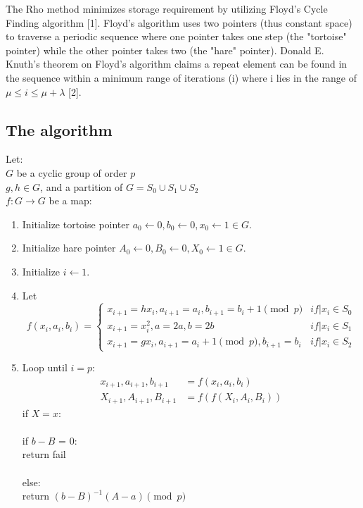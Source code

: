 \documentclass{article}
\begin{document}
    The Rho method minimizes storage requirement by utilizing Floyd's Cycle Finding algorithm [1].  Floyd's algorithm uses two pointers (thus constant space) to traverse a periodic sequence where one pointer takes one step (the "tortoise" pointer) while the other pointer takes two (the "hare" pointer).  Donald E. Knuth's theorem on Floyd's algorithm claims a repeat element can be found in the sequence within a minimum range of iterations (i) where i lies in the range of $\mu \leq i \leq \mu + \lambda$ [2]. \\

  \subsection{The algorithm}
    Let: \\
    $G$ be a cyclic group of order $p$ \\
    $g, h \in G$, and a partition of $G = S_0 \cup S_1 \cup S_2$ \\
    $f: G \to G$ be a map: \\
    \begin{enumerate} 
      \item Initialize tortoise pointer $a_0 \gets 0, b_0 \gets 0, x_0 \gets 1 \in G$. 
      \item Initialize hare pointer $A_0 \gets 0, B_0 \gets 0, X_0 \gets 1 \in G$.
      \item Initialize $i \gets 1$.
      \item Let 
        \[ f(x_i, a_i, b_i) = 
        \begin{cases}
          x_{i+1} = hx_i,  a_{i+1} = a_i,  b_{i+1} = b_i + 1\pmod p & {if\vert x_i \in S_0}\\
          x_{i+1} = x_i^{2},  a = 2a,  b = 2b & {if\vert x_i \in S_1}\\
          x_{i+1} = gx_i,  a_{i+1} = a_i + 1\pmod p,  b_{i+1} = b_i & {if\vert x_i \in S_2}
        \end{cases}
        \]
      \item Loop until $i = p$:\\
        \begin{align*}
          x_{i+1}, a_{i+1}, b_{i+1} &= f(x_i, a_i, b_i)\\
          X_{i+1}, A_{i+1}, B_{i+1} &= f(f(X_i, A_i, B_i))
        \end{align*}
        if $X = x$:\\ \\
          if $b - B$ = 0:\\ return fail\\ \\
          else:\\ return $(b - B)^{-1}(A - a)\pmod p$
    \end{enumerate}
\end{document}
